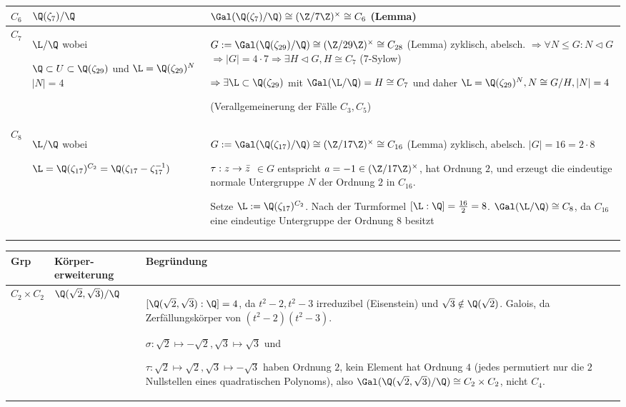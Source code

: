 \documentclass[11pt, a4paper]{article}
\begin{document}
\begin{example}
\begin{table}[H]
\begin{tabularx}{\textwidth}{|p{1cm}||p{2.9cm}|X|}
\hline
$C_6$ & $\Q(\zeta_7)/\Q$ & $\Gal(\Q(\zeta_7)/\Q) \cong (\Z/7\Z)^\times \cong C_6$ (Lemma) \\
\hline
 $C_7$ & $\L/\Q$ wobei \par $\Q\subset U\subset \Q(\zeta_{29})$ und $\L= \Q(\zeta_{29})^{N}$ $|N|=4$ & $G:=\Gal(\Q(\zeta_{29})/\Q) \cong (\Z/29\Z)^\times \cong C_{28}$ (Lemma) zyklisch, abelsch. $\Rightarrow \forall N\leq G: N\triangleleft G$ 
$\Rightarrow |G|=4\cdot 7 \Rightarrow \exists H\triangleleft G, H\cong C_7$ (7-Sylow)\par $\Rightarrow \exists \L\subset \Q(\zeta_{29})$ mit $\Gal(\L/\Q) = H\cong C_7$ und daher $\L=\Q(\zeta_{29})^N, N\cong G/H, |N|= 4$\par
 (Verallgemeinerung der Fälle $C_3,C_5$)\\ 


\hline

$C_8$ & $\L/\Q$ wobei \par $\L= \Q(\zeta_{17})^{C_2}= \Q(\zeta_{17}-\zeta_{17}^{-1})$ & 
$G:=\Gal(\Q(\zeta_{17})/\Q)\cong(\Z/17\Z)^\times\cong C_{16}$ (Lemma) zyklisch, abelsch. $|G|=16=2\cdot 8$\par
$\tau:z\to \Bar{z}$ $\in G$ entspricht $a=-1\in(\Z/17\Z)^\times$, hat Ordnung $2$, und erzeugt die eindeutige normale Untergruppe $N$ der Ordnung $2$ in $C_{16}$. \par
Setze $\L:= \Q(\zeta_{17})^{C_2}$. Nach der Turmformel $[\L:\Q] =\frac{16}{2} = 8$. $\Gal(\L/\Q) \cong C_8$, da $C_{16}$ eine eindeutige Untergruppe der Ordnung $8$ besitzt\\



\hline 

\end{tabularx}
\end{table}

\begin{table}[H]
\centering
\begin{tabularx}{\textwidth}{|p{1.2cm}||p{2.6cm}|X|}
\hline
\textbf{Grp} & \textbf{Körper-erweiterung} & \textbf{Begründung} \\
\hline

$C_2\times C_2$ & $\Q(\sqrt2,\sqrt3)/\Q$ & 
$[\Q(\sqrt2,\sqrt3):\Q]=4$, da $t^2-2,t^2-3$ irreduzibel (Eisenstein) und $\sqrt3\notin\Q(\sqrt2)$. Galois, da Zerfällungskörper von $(t^2-2)(t^2-3)$. \par
$\sigma:\sqrt2\mapsto-\sqrt2,\sqrt3\mapsto\sqrt3$ und \par $\tau:\sqrt2\mapsto\sqrt2,\sqrt3\mapsto-\sqrt3$ haben Ordnung $2$, kein Element hat Ordnung $4$ (jedes permutiert nur die $2$ Nullstellen eines quadratischen Polynoms), also $\Gal(\Q(\sqrt 2, \sqrt 3)/\Q)\cong C_2\times C_2$, nicht $C_4$.\\


\end{tabularx}
\end{table}
\end{example}
\end{document}
